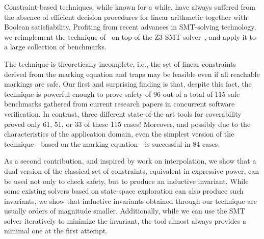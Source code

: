 Constraint-based techniques, while known for a while, have always
suffered from the absence of efficient decision procedures for 
linear arithmetic together with Boolean satisfiability.  
Profiting from recent advances in SMT-solving
technology, we reimplement the technique of~\cite{EsparzaMelzer00}
on top of the Z3 SMT solver~\cite{MouraB08}, and apply it to a large 
collection of benchmarks.

The technique is theoretically incomplete, i.e., the set of linear 
constraints derived from the marking equation and traps may be 
feasible even if all reachable markings are safe.
Our first and surprising finding is that, despite this fact, the technique
is powerful enough to prove safety of 96 out of a total
of 115 safe benchmarks gathered from current research papers in concurrent software verification. 
In contrast, three different state-of-the-art tools for coverability
proved only 61, 51, or 33 of these 115 cases!
Moreover, and possibly due to the characteristics of the
application domain, even the simplest version of the
technique—based on the marking equation—is successful in 84 cases.

As a second contribution, and inspired
by work on interpolation, we show that a dual version of the classical
set of constraints, equivalent in expressive power, can be used not
only to check safety, but to produce an inductive invariant.
While some existing solvers based on state-space
exploration can also produce such invariants, we show that inductive invariants obtained
through our technique are usually orders
of magnitude smaller.  Additionally, while we can use the 
SMT solver iteratively to minimize the invariant, the tool almost always
provides a minimal one at the first attempt.


